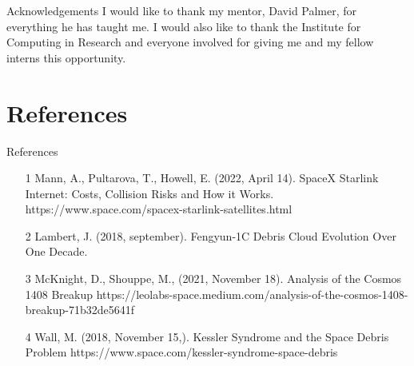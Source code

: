 \documentclass{beamer}
\begin{document}
\begin{frame}{Acknowledgements}
I would like to thank my mentor, David Palmer, for everything he has taught me.
\vfill
I would also like to thank the Institute for Computing in Research and everyone involved for giving me and my fellow interns this opportunity.
\end{frame}

\section{References}
\begin{frame}{References}
\begin{itemize}
\item [1] Mann, A., Pultarova, T.,  Howell, E. (2022, April 14). SpaceX Starlink Internet: Costs, Collision Risks and How it Works. https://www.space.com/spacex-starlink-satellites.html
\item [2] Lambert, J. (2018, september). Fengyun-1C Debris Cloud Evolution Over One Decade.
\item [3] McKnight, D., Shouppe, M., (2021, November 18). Analysis of the Cosmos 1408 Breakup  https://leolabs-space.medium.com/analysis-of-the-cosmos-1408-breakup-71b32de5641f
\item [4] Wall, M. (2018, November 15,). Kessler Syndrome and the Space Debris Problem  https://www.space.com/kessler-syndrome-space-debris
\end{itemize}
\end{frame}
\end{document}
